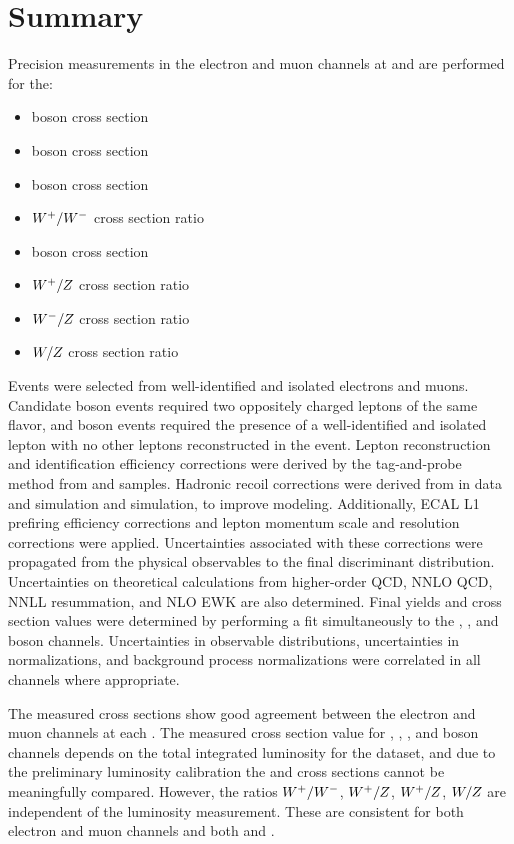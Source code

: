 \chapter{Summary}
Precision measurements in the electron and muon channels at \sg and \sh are performed for the:
\begin{itemize}
    \item \Wp boson cross section
    \item \Wm boson cross section
    \item \W boson cross section
    \item $W^+/W^-$ cross section ratio
    \item \Z boson cross section
    \item $W^+/Z$ cross section ratio
    \item $W^-/Z$ cross section ratio
    \item $W/Z$ cross section ratio
\end{itemize}
Events were selected from well-identified and isolated electrons and muons. Candidate \Z boson events required two oppositely charged leptons of the same flavor, and \W boson events required the presence of a well-identified and isolated lepton with no other leptons reconstructed in the event.
Lepton reconstruction and identification efficiency corrections were derived by the tag-and-probe method from \zee and \zmm samples. Hadronic recoil corrections were derived from \zmm in data and simulation and \wmunu simulation, to improve \met modeling. Additionally, ECAL L1 prefiring efficiency corrections and lepton momentum scale and resolution corrections were applied. Uncertainties associated with these corrections were propagated from the physical observables to the final discriminant distribution. Uncertainties on theoretical calculations from higher-order QCD, NNLO QCD, NNLL resummation, and NLO EWK are also determined.
Final yields and cross section values were determined by performing a fit simultaneously to the \Wp, \Wm, and \Z boson channels. Uncertainties in observable distributions, uncertainties in normalizations, and background process normalizations were correlated in all channels where appropriate.

The measured cross sections show good agreement between the electron and muon channels at each \s. The measured cross section value for \Wp, \Wm, \W, and \Z boson channels depends on the total integrated luminosity for the dataset, and due to the preliminary luminosity calibration the \sg and \sh cross sections cannot be meaningfully compared. However, the ratios $W^+/W^-$, $W^+/Z$, $W^+/Z$, $W/Z$ are independent of the luminosity measurement. These are consistent for both electron and muon channels and both \sg and \sh. 
